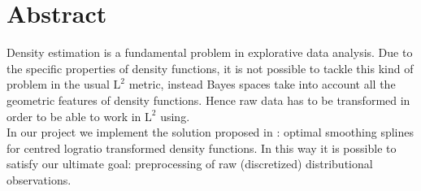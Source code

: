 \newpage
\chapter*{Abstract}


Density estimation is a fundamental problem in explorative data analysis.
Due to the specific properties of density functions, it is not possible to tackle this kind of problem in the usual $\text{L}^2$ metric, instead Bayes spaces take into account all the geometric features of density functions. Hence raw data has to be transformed in order to be able to work in $\text{L}^2$ using.\\
In our project we implement the solution proposed in \citep{paper:pacs}:  optimal smoothing splines for  centred logratio transformed density functions. In this way it is possible to satisfy our ultimate goal: preprocessing of raw (discretized) distributional observations. 


